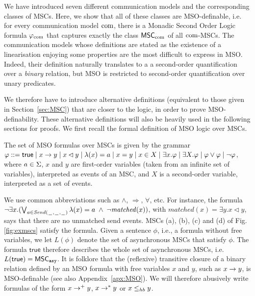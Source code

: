 

We have introduced seven different communication models and the corresponding classes of MSCs. Here, we show that all of these classes are MSO-definable, i.e. for every
communication model $\textup{com}$,
there is a Monadic Second Order Logic formula 
$\varphi_{{\textup{com}}}$ that captures 
exactly the class
$\mathsf{MSC}_{\textup{com}}$ of all
$\textup{com}$-MSCs.
The communication models whose definitions
are stated as the existence of a linearisation enjoying some properties are the most difficult
to express in MSO. 
Indeed, their definition naturally translates to a
a second-order quantification over a \emph{binary} relation, but MSO is restricted to second-order quantification over unary predicates. 

We therefore have to introduce alternative definitions (equivalent to those given in Section~\ref{sec:MSC}) that are closer to the logic, in order to prove MSO-definability. These alternative definitions will also be heavily used in the following sections for proofs. We first recall the formal definition of MSO logic over MSCs.

\begin{definition}
The set of MSO formulas over MSCs is given by the grammar
$
\varphi ::= \mathsf{true} \mid x \to y \mid x \lhd y \mid \lambda(x) = a \mid x = y \mid x \in X \mid \exists x.\varphi \mid \exists X.\varphi \mid \varphi \vee \varphi \mid \neg \varphi
$,
where $a \in \Sigma$, $x$ and $y$ are first-order variables (taken from an infinite set of variables), interpreted as
events of an MSC, and $X$ is a second-order variable, interpreted
as a set of events.
\end{definition}

We use common abbreviations such as $\wedge$, $\Rightarrow$, $\forall$, etc. 
For instance, the formula $\neg\exists x.(\bigvee_{a \in {\mathit{Send}(\hspace{0.1em}\underline{\hspace{0.5em}}\hspace{0.1em},\hspace{0.1em}\underline{\hspace{0.5em}}\hspace{0.1em},\hspace{0.1em}\underline{\hspace{0.5em}}\hspace{0.1em})}} \lambda(x) = a \;\wedge\; \neg \mathit{matched}(x))$,
with $\mathit{matched}(x) = \exists y.x \lhd y$,
says that there are no unmatched send events. MSCs (a), (b), (c) and (d) of Fig. \ref{fig:exmscs} satisfy the formula. Given a sentence $\phi$, i.e., a formula without free variables,
we let $L(\phi)$ denote the set of asynchronous MSCs that satisfy $\phi$. The formula $\mathsf{true}$ therefore describes the whole set of asynchronous MSCs, i.e. $L(\mathsf{true}) = \mathsf{MSC}_{\mathtt{asy}}$. It is folklore that the (reflexive) transitive closure of a binary relation defined by an MSO formula with free variables $x$ and $y$, such as $x \to y$, is MSO-definable (see also Appendix~\ref{apx:MSO}). We will therefore abusively write formulas of the form $x \to^+ y$, $x \to^* y$ or $x \leq_{hb} y$.

